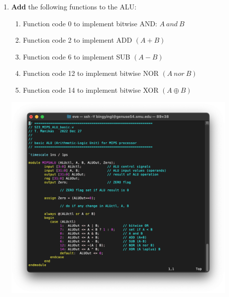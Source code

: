 \documentclass[12pt]{article}
\begin{document}
\begin{enumerate}
    \item \textbf{Add} the following functions to the ALU:
    \begin{enumerate}
        \item Function code 0 to implement bitwise AND: $A\ and \ B$
        \item Function code 2 to implement ADD $(A + B)$
        \item Function code 6 to implement SUB $(A - B)$
        \item Function code 12 to implement bitwise NOR $(A \ nor \ B)$
        \item Function code 14 to implement bitwise XOR $(A \oplus B)$
    \end{enumerate}
        \begin{center}
        \includegraphics[width=0.9\textwidth]{p2.png}
    \end{center}
    

\end{enumerate}
\end{document}
